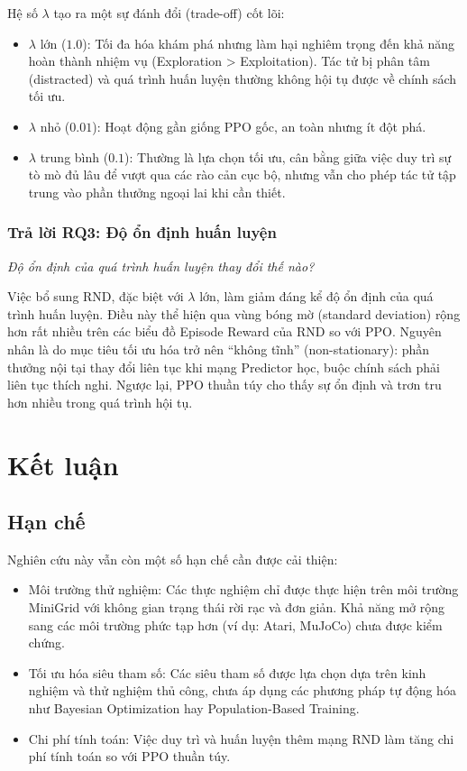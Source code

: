 \documentclass{uetgraduation}
\begin{document}
Hệ số $\lambda$ tạo ra một sự đánh đổi (trade-off) cốt lõi:
\begin{itemize}
    \item $\lambda$ lớn ($1.0$): Tối đa hóa khám phá nhưng làm hại nghiêm trọng đến khả năng hoàn thành nhiệm vụ (Exploration > Exploitation). Tác tử bị phân tâm (distracted) và quá trình huấn luyện thường không hội tụ được về chính sách tối ưu.
    \item $\lambda$ nhỏ ($0.01$): Hoạt động gần giống PPO gốc, an toàn nhưng ít đột phá.
    \item $\lambda$ trung bình ($0.1$): Thường là lựa chọn tối ưu, cân bằng giữa việc duy trì sự tò mò đủ lâu để vượt qua các rào cản cục bộ, nhưng vẫn cho phép tác tử tập trung vào phần thưởng ngoại lai khi cần thiết.
\end{itemize}

\subsection{Trả lời RQ3: Độ ổn định huấn luyện}
\textit{Độ ổn định của quá trình huấn luyện thay đổi thế nào?}

Việc bổ sung RND, đặc biệt với $\lambda$ lớn, làm giảm đáng kể độ ổn định của quá trình huấn luyện. Điều này thể hiện qua vùng bóng mờ (standard deviation) rộng hơn rất nhiều trên các biểu đồ Episode Reward của RND so với PPO. Nguyên nhân là do mục tiêu tối ưu hóa trở nên ``không tĩnh'' (non-stationary): phần thưởng nội tại thay đổi liên tục khi mạng Predictor học, buộc chính sách phải liên tục thích nghi. Ngược lại, PPO thuần túy cho thấy sự ổn định và trơn tru hơn nhiều trong quá trình hội tụ.

\chapter{Kết luận}

\section{Hạn chế}

Nghiên cứu này vẫn còn một số hạn chế cần được cải thiện:
\begin{itemize}
    \item Môi trường thử nghiệm: Các thực nghiệm chỉ được thực hiện trên môi trường MiniGrid với không gian trạng thái rời rạc và đơn giản. Khả năng mở rộng sang các môi trường phức tạp hơn (ví dụ: Atari, MuJoCo) chưa được kiểm chứng.
    \item Tối ưu hóa siêu tham số: Các siêu tham số được lựa chọn dựa trên kinh nghiệm và thử nghiệm thủ công, chưa áp dụng các phương pháp tự động hóa như Bayesian Optimization hay Population-Based Training.
    \item Chi phí tính toán: Việc duy trì và huấn luyện thêm mạng RND làm tăng chi phí tính toán so với PPO thuần túy.
\end{itemize}
\end{document}
